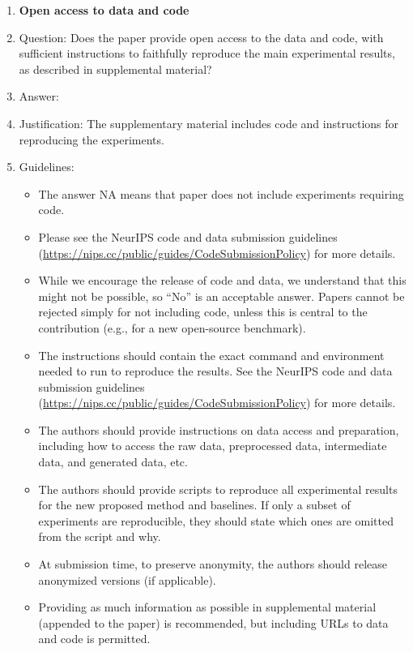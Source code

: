 \documentclass{article}
\begin{document}
\begin{enumerate}
\item {\bf Open access to data and code}
    \item[] Question: Does the paper provide open access to the data and code, with sufficient instructions to faithfully reproduce the main experimental results, as described in supplemental material?
    \item[] Answer: \answerYes{}
    \item[] Justification: The supplementary material includes code and instructions for reproducing the experiments.
    \item[] Guidelines:
    \begin{itemize}
        \item The answer NA means that paper does not include experiments requiring code.
        \item Please see the NeurIPS code and data submission guidelines (\url{https://nips.cc/public/guides/CodeSubmissionPolicy}) for more details.
        \item While we encourage the release of code and data, we understand that this might not be possible, so “No” is an acceptable answer. Papers cannot be rejected simply for not including code, unless this is central to the contribution (e.g., for a new open-source benchmark).
        \item The instructions should contain the exact command and environment needed to run to reproduce the results. See the NeurIPS code and data submission guidelines (\url{https://nips.cc/public/guides/CodeSubmissionPolicy}) for more details.
        \item The authors should provide instructions on data access and preparation, including how to access the raw data, preprocessed data, intermediate data, and generated data, etc.
        \item The authors should provide scripts to reproduce all experimental results for the new proposed method and baselines. If only a subset of experiments are reproducible, they should state which ones are omitted from the script and why.
        \item At submission time, to preserve anonymity, the authors should release anonymized versions (if applicable).
        \item Providing as much information as possible in supplemental material (appended to the paper) is recommended, but including URLs to data and code is permitted.
    \end{itemize}



\end{enumerate}
\end{document}
